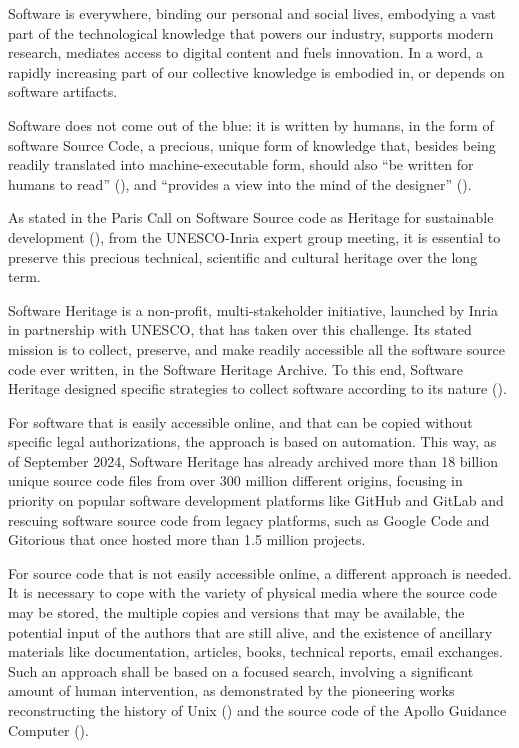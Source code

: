 \documentclass[]{article}
\begin{document}
Software is everywhere, binding our personal and social lives, embodying
a vast part of the technological knowledge that powers our industry,
supports modern research, mediates access to digital content and fuels
innovation. In a word, a rapidly increasing part of our collective
knowledge is embodied in, or depends on software artifacts.

Software does not come out of the blue: it is written by humans, in the
form of software Source Code, a precious, unique form of knowledge that,
besides being readily translated into machine-executable form, should
also ``be written for humans to read'' (\textcite{Abelson:SIC85}), and
``provides a view into the mind of the designer''
(\textcite{Shustek06}).

As stated in the Paris Call on Software Source code as Heritage for
sustainable development (\textcite{ParisCall2019}), from the
UNESCO-Inria expert group meeting, it is essential to preserve this
precious technical, scientific and cultural heritage over the long term.

Software Heritage is a non-profit, multi-stakeholder initiative,
launched by Inria in partnership with UNESCO, that has taken over this
challenge. Its stated mission is to collect, preserve, and make readily
accessible all the software source code ever written, in the Software
Heritage Archive. To this end, Software Heritage designed specific
strategies to collect software according to its nature
(\textcite{swhcacm2018}).

For software that is easily accessible online, and that can be copied
without specific legal authorizations, the approach is based on
automation. This way, as of September 2024, Software Heritage has
already archived more than 18 billion unique source code files from over
300 million different origins, focusing in priority on popular software
development platforms like GitHub and GitLab and rescuing software
source code from legacy platforms, such as Google Code and Gitorious
that once hosted more than 1.5 million projects.

For source code that is not easily accessible online, a different
approach is needed. It is necessary to cope with the variety of physical
media where the source code may be stored, the multiple copies and
versions that may be available, the potential input of the authors that
are still alive, and the existence of ancillary materials like
documentation, articles, books, technical reports, email exchanges. Such
an approach shall be based on a focused search, involving a significant
amount of human intervention, as demonstrated by the pioneering works
reconstructing the history of Unix (\textcite{SpinellisUnix2017}) and
the source code of the Apollo Guidance Computer (\textcite{VirtualAGC}).
\end{document}
